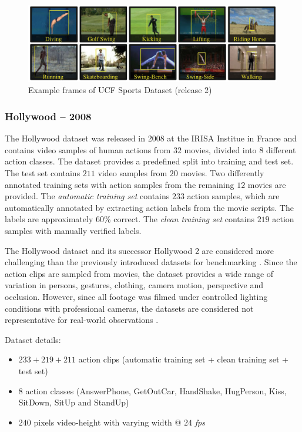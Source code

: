 \begin{figure}[H]
    \centering
    \includegraphics[width=\textwidth]{img_datasets/ucfsports2_example}
    \caption{Example frames of UCF Sports Dataset (release 2) \cite{soomro_action_2014}}
    \label{fig:ucfsports2_example}
\end{figure}


\subsubsection{Hollywood -- 2008}
The Hollywood dataset \cite{laptev_learning_2008} was released in 2008 at the IRISA Institue in France and contains video samples of human actions from $32$ movies, divided into $8$ different action classes.
The dataset provides a predefined split into training and test set.
The test set contains $211$ video samples from $20$ movies.
Two differently annotated training sets with action samples from the remaining $12$ movies are provided.
The \textit{automatic training set} contains $233$ action samples, which are automatically annotated by extracting action labels from the movie scripts.
The labels are approximately 60\% correct.
The \textit{clean training set} contains $219$ action samples with manually verified labels.

The Hollywood dataset and its successor Hollywood 2 are considered more challenging than the previously introduced datasets for benchmarking \cite{chaquet_survey_2013}.
Since the action clips are sampled from movies, the dataset provides a wide range of variation in persons, gestures, clothing, camera motion, perspective and occlusion.
However, since all footage was filmed under controlled lighting conditions with professional cameras, the datasets are considered not representative for real-world observations \cite{kang_review_2016}.

Dataset details: \cite{_ivan_????}
\begin{itemize}
    \item $233 + 219 + 211$ action clips (automatic training set + clean training set + test set)
    \item $8$ action classes (AnswerPhone, GetOutCar, HandShake, HugPerson, Kiss, SitDown, SitUp and StandUp)
    \item $240$ pixels video-height with varying width @ $24$ \textit{fps} 
\end{itemize}

